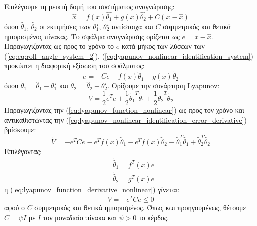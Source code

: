 \documentclass[a4paper,12pt]{article}
\begin{document}
Επιλέγουμε τη μεικτή δομή του συστήματος αναγνώρισης:
\begin{equation}
    \dot{\hat{x}} = f(x)\hat{\theta_1} + g(x) \hat{\theta_2} + 
    C (x - \hat{x})
    \label{eq:lyapunov_nonlinear_identification_system}
\end{equation}
όπου $\hat{\theta}_1,\, \hat{\theta}_2$ οι εκτιμήσεις των $\theta_1^{\star},\, \theta_2^{\star}$ αντίστοιχα 
και $C$ συμμετρικός και θετικά ημιορισμένος πίνακας. Το σφάλμα αναγνώρισης ορίζεται ως $e = x - \hat{x}$.
Παραγωγίζοντας ως προς το χρόνο το $e$ κατά μήκος των λύσεων των (\ref{eq:eq:roll_angle_system_2}), 
(\ref{eq:lyapunov_nonlinear_identification_system}) προκύπτει η διαφορική εξίσωση του σφάλματος:
\begin{equation}
    \dot{e} = - Ce - f(x) \tilde{\theta}_1 - g(x) \tilde{\theta}_2
    \label{eq:lyapunov_nonlinear_identification_error_derivative}
\end{equation}
όπου $\tilde{\theta}_1 = \hat{\theta}_1 - \theta_1^{\star}$ και 
$\tilde{\theta}_2 = \hat{\theta}_2 - \theta_2^{\star}$. Ορίζουμε την συνάρτηση 
Lyapunov:
\begin{equation}
    V = \frac{1}{2}e^Te + \frac{1}{2}{\tilde{\theta}_1}^T \tilde{\theta}_1 +
    \frac{1}{2}{\tilde{\theta}_2}^T \tilde{\theta}_2
    \label{eq:lyapunov_function_nonlinear}
\end{equation}
Παραγωγίζοντας την (\ref{eq:lyapunov_function_nonlinear}) ως προς τον χρόνο και αντικαθιστώντας την
(\ref{eq:lyapunov_nonlinear_identification_error_derivative}) βρίσκουμε:
\begin{equation}
    \dot{V} = -e^T C e - e^T f(x) \tilde{\theta}_1 - e^T f(x) \tilde{\theta}_2 + 
    \tilde{\theta}_1^T \dot{\hat{\theta}}_1 + \tilde{\theta}_2^T \dot{\hat{\theta}}_2
    \label{eq:lyapunov_function_derivative_nonlinear}
\end{equation}
Επιλέγοντας:
\begin{equation*}
    \begin{aligned}
        &\dot{\hat{\theta}}_1 = f^T(x) e \\
        &\dot{\hat{\theta}}_2 = g^T(x) e
    \end{aligned}
\end{equation*}
η (\ref{eq:lyapunov_function_derivative_nonlinear}) γίνεται:
\begin{equation*}
    \dot{V} = -e^T C e \leq 0
\end{equation*}
αφού ο $C$ συμμετρικός και θετικά ημιορισμένος. Όπως και προηγουμένως, θέτουμε $C = \psi I$ με $I$ τον 
μοναδιαίο πίνακα και $\psi > 0$ το κέρδος.
\end{document}
